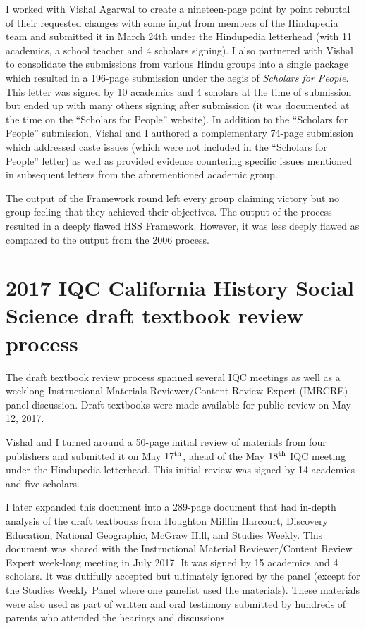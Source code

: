I worked with Vishal Agarwal to create a nineteen-page point by point rebuttal of their requested changes with some input from members of the Hindupedia team and submitted it in March 24th under the Hindupedia letterhead (with 11 academics, a school teacher and 4 scholars signing). I also partnered with Vishal to consolidate the submissions from various Hindu groups into a single package which resulted in a 196-page submission under the aegis of \textit{Scholars for People}. This letter was signed by 10 academics and 4 scholars at the time of submission but ended up with many others signing after submission (it was documented at the time on the “Scholars for People” website). In addition to the “Scholars for People” submission, Vishal and I authored a complementary 74-page submission which addressed caste issues (which were not included in the “Scholars for People” letter) as well as provided evidence countering specific issues mentioned in subsequent letters from the aforementioned academic group.

The output of the Framework round left every group claiming victory but no group feeling that they achieved their objectives. The output of the process resulted in a deeply flawed HSS Framework. However, it was less deeply flawed as compared to the output from the 2006 process.

\section*{2017 IQC California History Social Science draft textbook review process}

The draft textbook review process spanned several IQC meetings as well as a weeklong Instructional Materials Reviewer/Content Review Expert (IMRCRE) panel discussion. Draft textbooks were made available for public review on May 12, 2017. 

Vishal and I turned around a 50-page initial review of materials from four publishers and submitted it on May $17^{\rm th}$, ahead of the May $18^{\rm th}$ IQC meeting under the Hindupedia letterhead. This initial review was signed by 14 academics and five scholars. 

I later expanded this document into a 289-page document that had in-depth analysis of the draft textbooks from Houghton Mifflin Harcourt, Discovery Education, National Geographic, McGraw Hill, and Studies Weekly. This document was shared with the Instructional Material Reviewer/Content Review Expert week-long meeting in July 2017. It was signed by 15 academics and 4 scholars. It was dutifully accepted but ultimately ignored by the panel (except for the Studies Weekly Panel where one panelist used the materials). These materials were also used as part of written and oral testimony submitted by hundreds of parents who attended the hearings and discussions.

